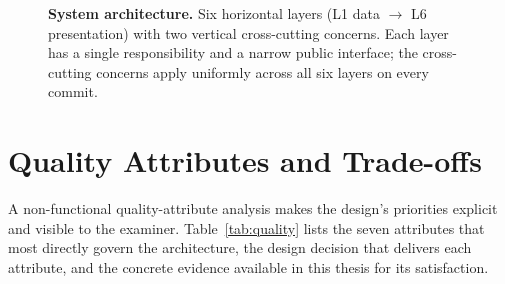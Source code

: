 \documentclass[11pt,a4paper,oneside]{report}
\begin{document}
\begin{figure}[htbp]
\caption[System architecture]{\textbf{System architecture.}
Six horizontal layers (L1 data $\to$ L6 presentation) with
two vertical cross-cutting concerns. Each layer has a
single responsibility and a narrow public interface; the
cross-cutting concerns apply uniformly across all six
layers on every commit.}
\label{fig:arch}
\end{figure}

\section{Quality Attributes and Trade-offs}
\label{sec:fw-quality}

A non-functional quality-attribute analysis makes the
design's priorities explicit and visible to the examiner.
Table~\ref{tab:quality} lists the seven attributes that
most directly govern the architecture, the design decision
that delivers each attribute, and the concrete evidence
available in this thesis for its satisfaction.
\end{document}
